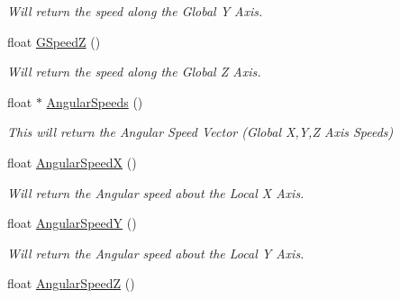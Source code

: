 \begin{DoxyCompactItemize}
\begin{DoxyCompactList}\small\item\em Will return the speed along the Global Y Axis. \end{DoxyCompactList}\item 
\hypertarget{classc_momentum_a0572c183336eeb1f5d9e21bbfffb9291}{
float \hyperlink{classc_momentum_a0572c183336eeb1f5d9e21bbfffb9291}{GSpeedZ} ()}
\label{classc_momentum_a0572c183336eeb1f5d9e21bbfffb9291}

\begin{DoxyCompactList}\small\item\em Will return the speed along the Global Z Axis. \end{DoxyCompactList}\item 
\hypertarget{classc_momentum_a7f11ef00456c99a4a7bbaf169445db8c}{
float $\ast$ \hyperlink{classc_momentum_a7f11ef00456c99a4a7bbaf169445db8c}{AngularSpeeds} ()}
\label{classc_momentum_a7f11ef00456c99a4a7bbaf169445db8c}

\begin{DoxyCompactList}\small\item\em This will return the Angular Speed Vector (Global X,Y,Z Axis Speeds) \end{DoxyCompactList}\item 
\hypertarget{classc_momentum_a7feaf09a6ac800e6e5971a445323a779}{
float \hyperlink{classc_momentum_a7feaf09a6ac800e6e5971a445323a779}{AngularSpeedX} ()}
\label{classc_momentum_a7feaf09a6ac800e6e5971a445323a779}

\begin{DoxyCompactList}\small\item\em Will return the Angular speed about the Local X Axis. \end{DoxyCompactList}\item 
\hypertarget{classc_momentum_a0600f643a0b75be8aaedf95fa05aa6c3}{
float \hyperlink{classc_momentum_a0600f643a0b75be8aaedf95fa05aa6c3}{AngularSpeedY} ()}
\label{classc_momentum_a0600f643a0b75be8aaedf95fa05aa6c3}

\begin{DoxyCompactList}\small\item\em Will return the Angular speed about the Local Y Axis. \end{DoxyCompactList}\item 
\hypertarget{classc_momentum_ab9d37f33cc2ca5b5138d25bc8e21a39f}{
float \hyperlink{classc_momentum_ab9d37f33cc2ca5b5138d25bc8e21a39f}{AngularSpeedZ} ()}
\label{classc_momentum_ab9d37f33cc2ca5b5138d25bc8e21a39f}


\end{DoxyCompactItemize}
